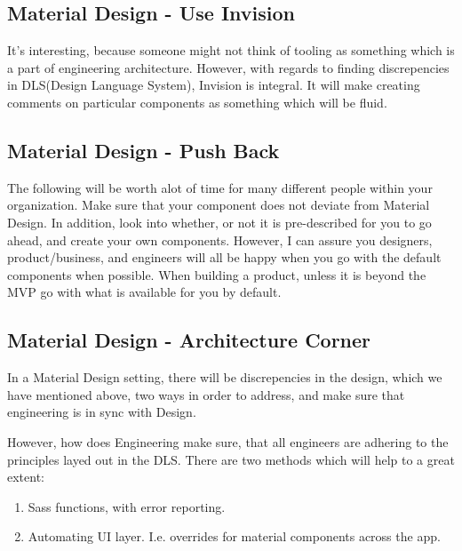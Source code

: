 \subsection{ Material Design - Use Invision }
It's interesting, because someone might not think of tooling as something which
is a part of engineering architecture. However, with regards to finding
discrepencies in DLS(Design Language System), Invision is integral. It will
make creating comments on particular components as something which will be fluid.

\subsection{ Material Design - Push Back }
The following will be worth alot of time for many different people within your
organization. Make sure that your component does not deviate from Material
Design. In addition, look into whether, or not it is pre-described for you to
go ahead, and create your own components. However, I can assure you designers,
product/business, and engineers will all be happy when you go with the default
components when possible. When building a product, unless it is beyond the MVP
go with what is available for you by default.

\subsection{ Material Design - Architecture Corner }
In a Material Design setting, there will be discrepencies in the design, which
we have mentioned above, two ways in order to address, and make sure that
engineering is in sync with Design.

However, how does Engineering make sure, that all engineers are adhering to the
principles layed out in the DLS. There are two methods which will help to a
great extent:
\begin{enumerate}
  \item Sass functions, with error reporting.
  \item Automating UI layer. I.e. overrides for material components across the
  app.
\end{enumerate}
